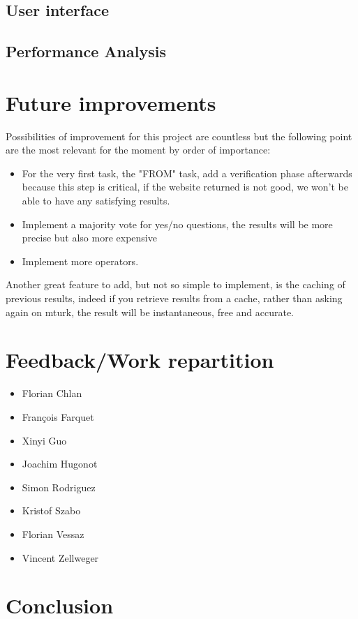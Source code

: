 \documentclass{article}
\begin{document}
\subsection{User interface}
\subsection{Performance Analysis}

\section{Future improvements} %
Possibilities of improvement for this project are countless but the following point are the most relevant for the moment by order of importance:
\begin{itemize}
\item For the very first task, the "FROM" task, add a verification phase afterwards because this step is critical, if the website returned is not good, we won't be able to have any satisfying results.
\item Implement a majority vote for yes/no questions, the results will be more precise but also more expensive
\item Implement more operators.


\end{itemize}
Another great feature to add, but not so simple to implement, is the caching of previous results, indeed if you retrieve results from a cache, rather than asking again on mturk, the result will be instantaneous, free and accurate.
\section{Feedback/Work repartition} %
\begin{itemize}
\item Florian Chlan
\item François Farquet
\item Xinyi Guo
\item Joachim Hugonot
\item Simon Rodriguez
\item Kristof Szabo
\item Florian Vessaz
\item Vincent Zellweger
\end{itemize}
\section{Conclusion}
\end{document}
